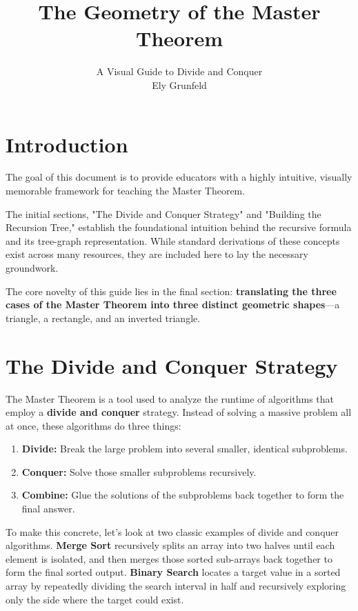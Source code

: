 \documentclass[11pt, a4paper]{article}
\title{\Huge \textbf{The Geometry of the Master Theorem}}
\author{\Large A Visual Guide to Divide and Conquer \\ \vspace{0.2cm} \large Ely Grunfeld}
\date{} %
\begin{document}
\maketitle

\section*{Introduction}

The goal of this document is to provide educators with a highly intuitive, visually memorable framework for teaching the Master Theorem. 

The initial sections, "The Divide and Conquer Strategy" and "Building the Recursion Tree," establish the foundational intuition behind the recursive formula and its tree-graph representation. While standard derivations of these concepts exist across many resources, they are included here to lay the necessary groundwork. 

The core novelty of this guide lies in the final section: \textbf{translating the three cases of the Master Theorem into three distinct geometric shapes}—a triangle, a rectangle, and an inverted triangle.


\section*{The Divide and Conquer Strategy}

The Master Theorem is a tool used to analyze the runtime of algorithms that employ a \textbf{divide and conquer} strategy. Instead of solving a massive problem all at once, these algorithms do three things:
\begin{enumerate}
    \item \textbf{Divide:} Break the large problem into several smaller, identical subproblems.
    \item \textbf{Conquer:} Solve those smaller subproblems recursively.
    \item \textbf{Combine:} Glue the solutions of the subproblems back together to form the final answer.
\end{enumerate}
To make this concrete, let's look at two classic examples of divide and conquer algorithms. \textbf{Merge Sort} recursively splits an array into two halves until each element is isolated, and then merges those sorted sub-arrays back together to form the final sorted output. \textbf{Binary Search} locates a target value in a sorted array by repeatedly dividing the search interval in half and recursively exploring only the side where the target could exist.
\end{document}
